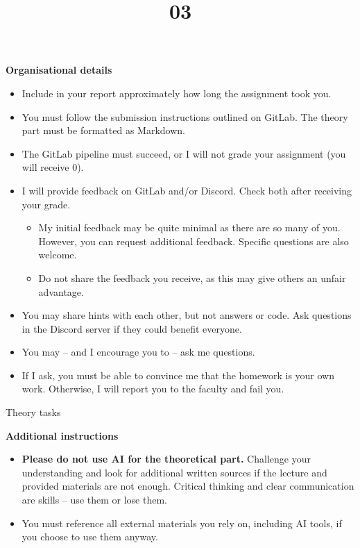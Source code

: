 \documentclass{homework}
\title{03}
\begin{document}
\maketitle

\textbf{Organisational details}

\begin{itemize}
  \item Include in your report approximately how long the assignment took you.
  \item You must follow the submission instructions outlined on GitLab.
  The theory part must be formatted as Markdown.
  \item The GitLab pipeline must succeed, or I will not grade your assignment (you will receive 0).
  \item I will provide feedback on GitLab and/or Discord.
  Check both after receiving your grade.
  \begin{itemize}
    \item My initial feedback may be quite minimal as there are so many of you.
    However, you can request additional feedback.
    Specific questions are also welcome.
    \item Do not share the feedback you receive, as this may give others an unfair advantage.
  \end{itemize}
  \item You may share hints with each other, but not answers or code.
  Ask questions in the Discord server if they could benefit everyone.
  \item You may -- and I encourage you to -- ask me questions.
  \item If I ask, you must be able to convince me that the homework is your own work.
  Otherwise, I will report you to the faculty and fail you.
\end{itemize}

\newpage

\begin{center}
  Theory tasks
\end{center}

\textbf{Additional instructions}

\begin{itemize}
  \item \textbf{Please do not use AI for the theoretical part.}
  Challenge your understanding and look for additional written sources if the lecture and provided materials are not enough.
  Critical thinking and clear communication are skills -- use them or lose them.
  \item You must reference all external materials you rely on, including AI tools, if you choose to use them anyway.
\end{itemize}
\end{document}
